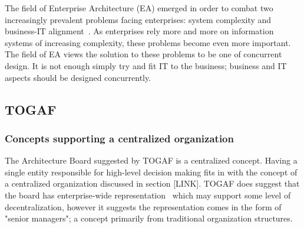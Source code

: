 The field of Enterprise Architecture (EA) emerged in order to combat two increasingly prevalent problems facing enterprises: system complexity and business-IT alignment~\cite{sessions2007}. As enterprises rely more and more on information systems of increasing complexity, these problems become even more important. The field of EA views the solution to these problems to be one of concurrent design. It is not enough simply try and fit IT to the business; business and IT aspects should be designed concurrently.
%
%   
%    

%

\subsection{TOGAF}

\subsubsection{Concepts supporting a centralized organization}


The Architecture Board suggested by TOGAF is a centralized concept. Having a single entity responsible for high-level decision making fits in with the concept of a centralized organization discussed in section [LINK]. TOGAF does suggest that the board has enterprise-wide representation~\cite{togaf9.1} which may support some level of decentralization, however it suggests the representation comes in the form of "senior managers"; a concept primarily from traditional organization structures. 

